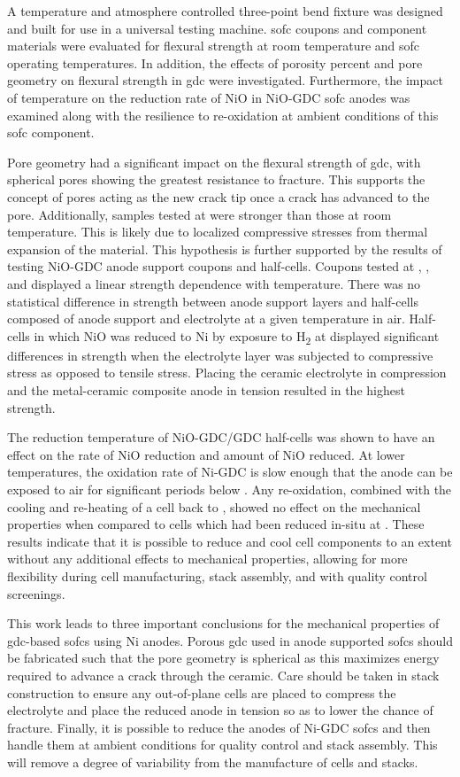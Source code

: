 A temperature and atmosphere controlled three-point bend fixture was designed and built for use in a universal testing machine.
\gls{sofc} coupons and component materials were evaluated for flexural strength at room temperature and \gls{sofc} operating temperatures.
In addition, the effects of porosity percent and pore geometry on flexural strength in \gls{gdc} were investigated.
Furthermore, the impact of temperature on the reduction rate of NiO in NiO-GDC \gls{sofc} anodes was examined along with the resilience to re-oxidation at ambient conditions of this \gls{sofc} component.

Pore geometry had a significant impact on the flexural strength of
\Gls{gdc}, with spherical pores showing the greatest resistance to fracture.
This supports the concept of pores acting as the new crack tip once a crack has advanced to the pore.
Additionally, samples tested at  were stronger than those at room temperature.
This is likely due to localized compressive stresses from thermal expansion of the material.
This hypothesis is further supported by the results of testing NiO-GDC
anode support coupons and half-cells.
Coupons tested at , , and  displayed a linear strength dependence with temperature.
There was no statistical difference in strength between anode support layers and half-cells composed of anode support and electrolyte at a given temperature in air.
Half-cells in which NiO was reduced to Ni by exposure to H\textsubscript{2} at  displayed significant differences in strength when the electrolyte layer was subjected to compressive stress as opposed to tensile stress.
Placing the ceramic electrolyte in compression and the metal-ceramic composite anode in tension resulted in the highest strength.

The reduction temperature of NiO-GDC/GDC half-cells was shown to have an effect on the rate of NiO reduction and amount of NiO reduced.
At lower temperatures, the oxidation rate of Ni-GDC is slow enough that the anode can be exposed to air for significant periods below .
Any re-oxidation, combined with the cooling and re-heating of a cell back to
, showed no effect on the mechanical properties when compared to cells which had been reduced in-situ at .
These results indicate that it is possible to reduce and cool cell components to an extent without any additional effects to mechanical properties, allowing for more flexibility during cell manufacturing, stack assembly, and with quality control screenings.

This work leads to three important conclusions for the mechanical properties of \gls{gdc}-based \glspl{sofc} using Ni anodes.
Porous \gls{gdc} used in anode supported \glspl{sofc} should be fabricated such that the pore geometry is spherical as this maximizes energy required to advance a crack through the ceramic.
Care should be taken in stack construction to ensure any out-of-plane cells are placed to compress the electrolyte and place the reduced anode in tension so as to lower the chance of fracture.
Finally, it is possible to reduce the anodes of Ni-GDC \glspl{sofc} and then handle them at ambient conditions for quality control and stack assembly.
This will remove a degree of variability from the manufacture of cells and stacks.
